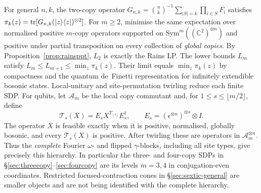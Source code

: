 \begin{theorem}
\label{thm:spinflip-ppt-hierarchy}
For general $n,k$, the two-copy operator
$G_{n,k}=\binom nk^{-1}\sum_{|S|=k}\prod_{i\in S}F_i$
satisfies $\pi_k(z)=\operatorname{tr}[G_{n,k}(|z\rangle\langle z|)^{\otimes2}]$.
For $m\geq2$, minimise the same expectation over normalised positive
$m$-copy operators supported on $\mathrm{Sym}^m((\mathbb C^2)^{\otimes n})$
and positive under partial transposition on every collection of
\emph{global copies}. By Proposition~\ref{prop:rainsppt}, $L_2$ is exactly the Rains LP.
The lower bounds $L_m$ satisfy
$L_m\leq L_{m+1}\leq\min_z\pi_k(z)$.
Their limit equals $\min_z\pi_k(z)$ by compactness and the quantum
de~Finetti representation for infinitely extendible bosonic states.
Local-unitary and site-permutation twirling reduce each finite SDP.
For qubits, let $\mathcal A_m$ be the local copy commutant and,
for $1\le s\le\lfloor m/2\rfloor$, define
\[
 \mathcal T_s(X)=E_sX^{T_{[s]}}E_s^\dagger,
 \qquad E_s=(\epsilon^{\otimes n})^{\otimes s}\otimes I.
\]
The operator $X$ is feasible exactly when it is positive, normalised,
globally bosonic, and every $\mathcal T_s(X)$ is positive.
After twirling these are operators in $\mathcal A_m^{\otimes n}$.
Thus the \emph{complete} Fourier $\omega$- and flipped $\gamma$-blocks,
including all site types, give precisely this hierarchy.
In particular the three- and four-copy SDPs in
\S\ref{sec:threecopy}--\ref{sec:fourcopy} are its levels $m=3,4$
in conjugation-even coordinates. Restricted focused-contraction
cones in \S\ref{sec:sextic-general} are smaller objects and are not being
identified with the complete hierarchy.
\end{theorem}

